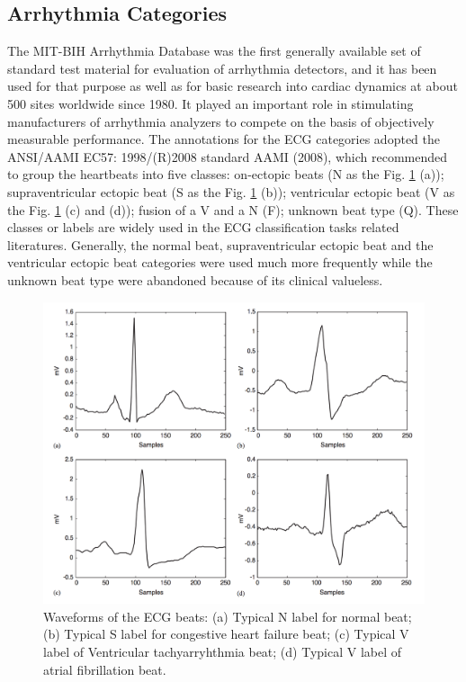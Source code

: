 \documentclass[journal]{IEEEtran}
\begin{document}
\subsection{Arrhythmia Categories}
The MIT-BIH Arrhythmia Database was the first generally available set of standard test material for evaluation of arrhythmia detectors, and it has been used for that purpose as well as for basic research into cardiac dynamics at about 500 sites worldwide since 1980. It played an important role in stimulating manufacturers of arrhythmia analyzers to compete on the basis of objectively measurable performance. The annotations for the ECG categories adopted the ANSI/AAMI EC57: 1998/(R)2008 standard AAMI (2008), which recommended to group the heartbeats into five classes: on-ectopic beats (N as the Fig. \ref{figure2} (a)); supraventricular ectopic beat (S as the Fig. \ref{figure2} (b)); ventricular ectopic beat (V as the Fig. \ref{figure2} (c) and (d)); fusion of a V and a N (F); unknown beat type (Q). These classes or labels are widely used in the ECG classification tasks related literatures. Generally, the normal beat, supraventricular ectopic beat and the ventricular ectopic beat categories were used much more frequently while the unknown beat type were abandoned because of its clinical valueless.  

\begin{figure}[]
\centering
\includegraphics[width=3.5 in]{eps/figure2_ecg_beats.png}
\caption{Waveforms of the ECG beats: (a) Typical N label for normal beat; (b) Typical S label for congestive heart failure beat; (c) Typical V label of Ventricular tachyarryhthmia beat; (d) Typical V label of atrial fibrillation beat.}
\label{figure2}
\end{figure}
\end{document}
